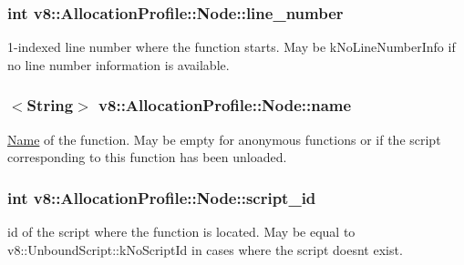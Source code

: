 \subsubsection[{\texorpdfstring{line\+\_\+number}{line_number}}]{\setlength{\rightskip}{0pt plus 5cm}int v8\+::\+Allocation\+Profile\+::\+Node\+::line\+\_\+number}\hypertarget{structv8_1_1AllocationProfile_1_1Node_ac9773c92a3af3a9a9420337599e68bd9}{}\label{structv8_1_1AllocationProfile_1_1Node_ac9773c92a3af3a9a9420337599e68bd9}
1-\/indexed line number where the function starts. May be k\+No\+Line\+Number\+Info if no line number information is available. 
\subsubsection[{\texorpdfstring{name}{name}}]{$<${\bf String}$>$ v8\+::\+Allocation\+Profile\+::\+Node\+::name}\hypertarget{structv8_1_1AllocationProfile_1_1Node_af9f2c323d6a11e836c02e8ac88adc5a8}{}\label{structv8_1_1AllocationProfile_1_1Node_af9f2c323d6a11e836c02e8ac88adc5a8}
\hyperlink{classv8_1_1Name}{Name} of the function. May be empty for anonymous functions or if the script corresponding to this function has been unloaded. 
\subsubsection[{\texorpdfstring{script\+\_\+id}{script_id}}]{\setlength{\rightskip}{0pt plus 5cm}int v8\+::\+Allocation\+Profile\+::\+Node\+::script\+\_\+id}\hypertarget{structv8_1_1AllocationProfile_1_1Node_a4a746de878d9ad42b32fda4c365b98fb}{}\label{structv8_1_1AllocationProfile_1_1Node_a4a746de878d9ad42b32fda4c365b98fb}
id of the script where the function is located. May be equal to v8\+::\+Unbound\+Script\+::k\+No\+Script\+Id in cases where the script doesn\textquotesingle{}t exist. 
